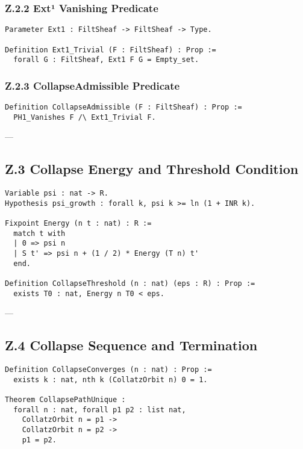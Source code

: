 \documentclass[11pt]{article}
\begin{document}
\subsubsection*{Z.2.2 Ext¹ Vanishing Predicate}

\begin{lstlisting}[language=Coq]
Parameter Ext1 : FiltSheaf -> FiltSheaf -> Type.

Definition Ext1_Trivial (F : FiltSheaf) : Prop :=
  forall G : FiltSheaf, Ext1 F G = Empty_set.
\end{lstlisting}

\subsubsection*{Z.2.3 CollapseAdmissible Predicate}

\begin{lstlisting}[language=Coq]
Definition CollapseAdmissible (F : FiltSheaf) : Prop :=
  PH1_Vanishes F /\ Ext1_Trivial F.
\end{lstlisting}

---

\subsection*{Z.3 Collapse Energy and Threshold Condition}

\begin{lstlisting}[language=Coq]
Variable psi : nat -> R.
Hypothesis psi_growth : forall k, psi k >= ln (1 + INR k).

Fixpoint Energy (n t : nat) : R :=
  match t with
  | 0 => psi n
  | S t' => psi n + (1 / 2) * Energy (T n) t'
  end.

Definition CollapseThreshold (n : nat) (eps : R) : Prop :=
  exists T0 : nat, Energy n T0 < eps.
\end{lstlisting}

---

\subsection*{Z.4 Collapse Sequence and Termination}

\begin{lstlisting}[language=Coq]
Definition CollapseConverges (n : nat) : Prop :=
  exists k : nat, nth k (CollatzOrbit n) 0 = 1.

Theorem CollapsePathUnique :
  forall n : nat, forall p1 p2 : list nat,
    CollatzOrbit n = p1 ->
    CollatzOrbit n = p2 ->
    p1 = p2.
\end{lstlisting}
\end{document}
